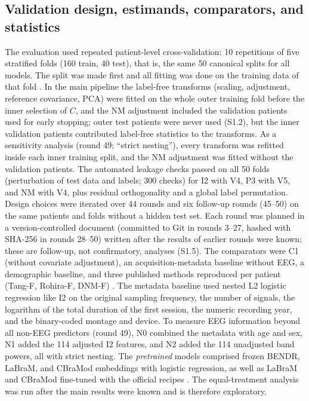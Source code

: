 \subsection{Validation design, estimands, comparators, and statistics}\label{sec:validasi}

The evaluation used repeated patient-level cross-validation: 10 repetitions of five stratified folds (160 train, 40 test), that is, the same 50 canonical splits for all models. The split was made first and all fitting was done on the training data of that fold \cite{varma2006,rosenblatt2024,delpup2025,brookshire2024}.
In the main pipeline the label-free transforms (scaling, adjustment, reference covariance, PCA) were fitted on the whole outer training fold before the inner selection of $C$, and the NM adjustment included the validation patients used for early stopping; outer test patients were never used (S1.2), but the inner validation patients contributed label-free statistics to the transforms. As a sensitivity analysis (round 49; ``strict nesting''), every transform was refitted inside each inner training split, and the NM adjustment was fitted without the validation patients.
The automated leakage checks passed on all 50 folds (perturbation of test data and labels; 300 checks) for I2 with V4, P3 with V5, and NM with V4, plus residual orthogonality and a global label permutation.
Design choices were iterated over 44 rounds and six follow-up rounds (45--50) on the same patients and folds without a hidden test set. Each round was planned in a version-controlled document (committed to Git in rounds 3--27, hashed with SHA-256 in rounds 28--50) written after the results of earlier rounds were known; these are follow-up, not confirmatory, analyses (S1.5).
The comparators were C1 (without covariate adjustment), an acquisition-metadata baseline without EEG, a demographic baseline, and three published methods reproduced per patient (Tang-F, Rohira-F, DNM-F) \cite{rohira2023,tang2024,myers2025}. The metadata baseline used nested L2 logistic regression like I2 on the original sampling frequency, the number of signals, the logarithm of the total duration of the first session, the numeric recording year, and the binary-coded montage and device. To measure EEG information beyond all non-EEG predictors (round 49), N0 combined the metadata with age and sex, N1 added the 114 adjusted I2 features, and N2 added the 114 unadjusted band powers, all with strict nesting. The \textit{pretrained} models comprised frozen BENDR, LaBraM, and CBraMod embeddings with logistic regression, as well as LaBraM and CBraMod fine-tuned with the official recipes \cite{kostas2021,jiang2024,wang2025cbramod}. The equal-treatment analysis was run after the main results were known and is therefore exploratory.
